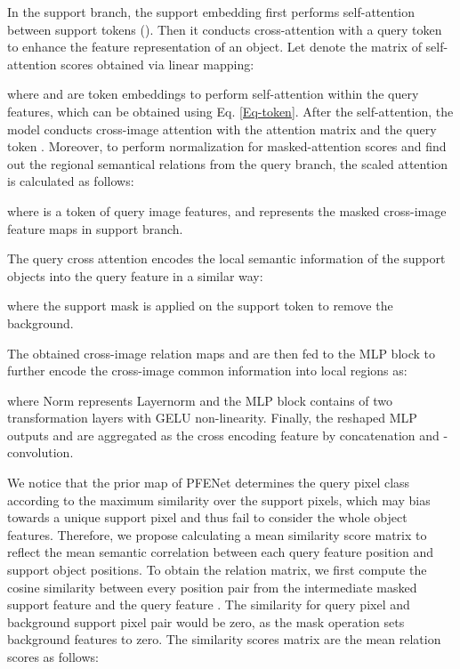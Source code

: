\documentclass[conference]{IEEEtran}
\begin{document}
In the support branch, the support embedding first performs self-attention between support tokens (). Then it conducts cross-attention with a query token  to enhance the feature representation of an object. Let  denote the matrix of self-attention scores obtained via linear mapping:

where  and  are token embeddings to perform self-attention within the query features, which can be obtained using Eq. \ref{Eq-token}. After the self-attention, the model conducts cross-image attention with the attention matrix  and the query token . Moreover, to perform normalization for masked-attention scores and find out the regional semantical relations from the query branch, the scaled attention is calculated as follows:

where  is a token of query image features, and  represents the masked cross-image feature maps in support branch.

The query cross attention encodes the local semantic information of the support objects into the query feature in a similar way:



where the support mask is applied on the support token to remove the background.

The obtained cross-image relation maps  and  are then fed to the MLP block to further encode the cross-image common information into local regions as: 

where Norm represents Layernorm and the MLP block contains of two transformation layers with GELU non-linearity. Finally, the reshaped MLP outputs  and  are aggregated as the cross encoding feature  by concatenation and -convolution.

We notice that the prior map of PFENet \cite{PFENet} determines the query pixel class according to the maximum similarity over the support pixels, which may bias towards a unique support pixel and thus fail to consider the whole object features. Therefore, we propose calculating a mean similarity score matrix to reflect the mean semantic correlation between each query feature position and support object positions. To obtain the relation matrix, we first compute the cosine similarity between every position pair  from the intermediate masked support feature  and the query feature . The similarity for query pixel and background support pixel pair would be zero, as the mask operation sets background features to zero. The  similarity scores matrix  are the mean relation scores as follows:
\end{document}
